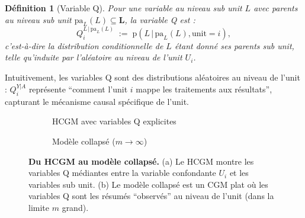 \documentclass[11pt,a4paper]{article}
\newcommand{\g}{\,\vert\,}
\newcommand{\pr}{\mathrm{p}}
\newtheorem{definition}{Définition}
\begin{document}
\begin{definition}[Variable Q]
Pour une variable au niveau sub unit $L$ avec parents au niveau sub unit $\mathrm{pa}_L(L) \subseteq \mathbf{L}$, la variable Q est :
\begin{equation}
  Q^{L \g \mathrm{pa}_L(L)}_i \;:=\; \pr\!\left(L \g \mathrm{pa}_L(L), \text{unit}=i\right),
\end{equation}
c'est-à-dire la distribution conditionnelle de $L$ étant donné ses parents sub unit, telle qu'induite par l'aléatoire au niveau de l'unit $U_i$.
\end{definition}

Intuitivement, les variables Q sont des distributions aléatoires au niveau de l'unit : $Q^{Y|A}_i$ représente ``comment l'unit $i$ mappe les traitements aux résultats'', capturant le mécanisme causal spécifique de l'unit.

\begin{figure}[h!]
\centering
\begin{subfigure}[t]{0.45\textwidth}
\caption{HCGM avec variables Q explicites} \label{fig:hcgm_q}
\centering
{}
\end{subfigure}
\hfill
\begin{subfigure}[t]{0.45\textwidth}
\caption{Modèle collapsé ($m \to \infty$)} \label{fig:collapsed_q}
\centering
{}
\end{subfigure}
\caption{\textbf{Du HCGM au modèle collapsé.} (a) Le HCGM montre les variables Q médiantes entre la variable confondante $U_i$ et les variables sub unit. (b) Le modèle collapsé est un CGM plat où les variables Q sont les résumés ``observés'' au niveau de l'unit (dans la limite $m$ grand).}
\label{fig:hcgm_to_collapsed}
\end{figure}
\end{document}
